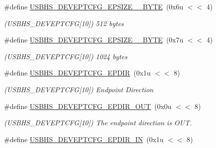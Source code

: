\begin{DoxyCompactItemize}
\#define \mbox{\hyperlink{group__SAMS70__USBHS_ga2d333b468cf7268f13cf096b3fab2467}{U\+S\+B\+H\+S\+\_\+\+D\+E\+V\+E\+P\+T\+C\+F\+G\+\_\+\+E\+P\+S\+I\+Z\+E\+\_\+\_\+\+B\+Y\+TE}}~(0x6u $<$$<$ 4)
\begin{DoxyCompactList}\small\item\em (U\+S\+B\+H\+S\+\_\+\+D\+E\+V\+E\+P\+T\+C\+FG\mbox{[}10\mbox{]}) 512 bytes \end{DoxyCompactList}\item 
\mbox{\label{group__SAMS70__USBHS_ga22733ae82f074ec9b79dc1d573ada90d}} 
\#define \mbox{\hyperlink{group__SAMS70__USBHS_ga22733ae82f074ec9b79dc1d573ada90d}{U\+S\+B\+H\+S\+\_\+\+D\+E\+V\+E\+P\+T\+C\+F\+G\+\_\+\+E\+P\+S\+I\+Z\+E\+\_\+\_\+\+B\+Y\+TE}}~(0x7u $<$$<$ 4)
\begin{DoxyCompactList}\small\item\em (U\+S\+B\+H\+S\+\_\+\+D\+E\+V\+E\+P\+T\+C\+FG\mbox{[}10\mbox{]}) 1024 bytes \end{DoxyCompactList}\item 
\mbox{\label{group__SAMS70__USBHS_ga0ecea3cab7098eb72284e7764de66b99}} 
\#define \mbox{\hyperlink{group__SAMS70__USBHS_ga0ecea3cab7098eb72284e7764de66b99}{U\+S\+B\+H\+S\+\_\+\+D\+E\+V\+E\+P\+T\+C\+F\+G\+\_\+\+E\+P\+D\+IR}}~(0x1u $<$$<$ 8)
\begin{DoxyCompactList}\small\item\em (U\+S\+B\+H\+S\+\_\+\+D\+E\+V\+E\+P\+T\+C\+FG\mbox{[}10\mbox{]}) Endpoint Direction \end{DoxyCompactList}\item 
\mbox{\label{group__SAMS70__USBHS_gaa1a02d73157950451d7a5264a081bd58}} 
\#define \mbox{\hyperlink{group__SAMS70__USBHS_gaa1a02d73157950451d7a5264a081bd58}{U\+S\+B\+H\+S\+\_\+\+D\+E\+V\+E\+P\+T\+C\+F\+G\+\_\+\+E\+P\+D\+I\+R\+\_\+\+O\+UT}}~(0x0u $<$$<$ 8)
\begin{DoxyCompactList}\small\item\em (U\+S\+B\+H\+S\+\_\+\+D\+E\+V\+E\+P\+T\+C\+FG\mbox{[}10\mbox{]}) The endpoint direction is O\+UT. \end{DoxyCompactList}\item 
\mbox{\label{group__SAMS70__USBHS_ga1ba830969571ea8556bc92f33d94c456}} 
\#define \mbox{\hyperlink{group__SAMS70__USBHS_ga1ba830969571ea8556bc92f33d94c456}{U\+S\+B\+H\+S\+\_\+\+D\+E\+V\+E\+P\+T\+C\+F\+G\+\_\+\+E\+P\+D\+I\+R\+\_\+\+IN}}~(0x1u $<$$<$ 8)
$$
\end{DoxyCompactItemize}
